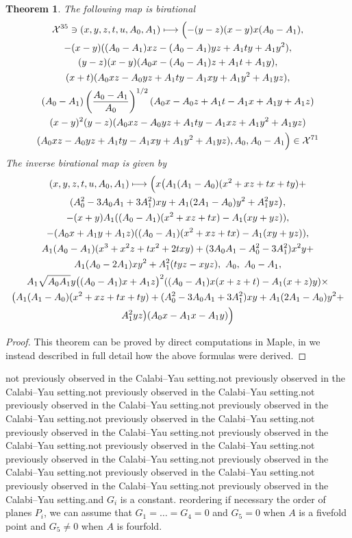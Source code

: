 \documentclass[12pt]{amsart}
\theoremstyle{plain}
\newtheorem{theorem}{Theorem}[section]
\theoremstyle{remark}
\theoremstyle{definition}
\numberwithin{table}{section}
\begin{document}
\begin{theorem}
	The following map is birational
	\begin{multline*}
		\mathcal{X}^{35}\ni(x,y,z,t,u,A_{0},A_{1}) \longmapsto
		\Bigl(
		-(y-z)(x-y)x(A_{0}-A_{1}),\\ -(x-y)((A_{0}-A_{1})xz-(A_{0}-A_{1})yz+A_{1}ty+A_{1}y^2),\\ (y-z)(x-y)(A_{0}x-(A_{0}-A_{1})z+A_{1}t+A_{1}y),\\ (x+t)(A_{0}xz-A_{0}yz+A_{1}ty-A_{1}xy+A_{1}
		y^2+A_{1}yz),\\ (A_{0}-A_{1})\left(\frac{A_{0}-A_{1}}{A_{0}}\right)^{1/2}
		(A_{0}x-A_{0}z+A_{1}t-A_{1}x+A_{1}y+A_{1}z)\\
		(x-y)^2(y-z)(A_{0}xz-A_{0}yz+A_{1}ty-A_{1}xz+A_{1}y^2+A_{1}yz)\\
		(A_{0}xz-A_{0}yz+A_{1}ty-A_{1}xy+A_{1}y^2+A_{1}yz), A_{0}, A_{0}-A_{1}
		\Bigr)\in\mathcal{X}^{71}
	\end{multline*}
	The inverse birational map is given by
	\begin{multline*}
		(x,y,z,t,u,A_{0},A_{1}) \longmapsto
		\Bigl(
		x\bigl(A_1(A_1-A_0)(x^2+xz+tx+ty)+\\(A_{0}^2-3A_0A_1+3A_1^2)xy+A_1(2A_1-A_{0})y^2+A_{1}^2yz\bigr),\\
		-(x+y)A_{1}((A_0-A_1)(x^2+xz+tx)-A_{1}(xy+yz)),\\ -(A_{0}x+A_{1}y+A_{1}z)((A_{0}-A_1)(x^2+xz+tx)-A_{1}(xy+yz)),\\
		A_1(A_0-A_1)(x^3+x^2z+tx^2+2txy)+(3A_{0}A_{1}-A_{0}^2-3A_{1}^2)x^2y+\\
		A_1(A_{0}-2A_1)xy^2+
		A_{1}^2(tyz-xyz), \ A_{0}, \ A_{0}-A_{1},\\
		A_{1}\sqrt{A_{0}A_{1}}y\bigl((A_{0}-A_{1})x+A_{1}z\bigr)^2
		((A_{0}-A_1)x(x+z+t)-A_{1}(x+z)y)\times\\
		\bigl(A_1(A_1-A_{0})(x^2+xz+tx+ty)+(A_{0}^2-3A_0A_1+3A_1^2)xy+A_1(2A_{1}-A_{0})y^2+\\A_{1}^2yz\bigr)(A_{0}x-A_{1}x-A_{1}y)
		\Bigr)
	\end{multline*}
\end{theorem}
\begin{proof}
	This theorem can be proved by direct computations in Maple, in \cite{CK-C2} we instead described in full detail how the above formulas were derived.
\end{proof}

not previously observed in the Calabi--Yau setting.not previously observed in the Calabi--Yau setting.not previously observed in the Calabi--Yau setting.not previously observed in the Calabi--Yau setting.not previously observed in the Calabi--Yau setting.not previously observed in the Calabi--Yau setting.not previously observed in the Calabi--Yau setting.not previously observed in the Calabi--Yau setting.not previously observed in the Calabi--Yau setting.not previously observed in the Calabi--Yau setting.not previously observed in the Calabi--Yau setting.not previously observed in the Calabi--Yau setting.not previously observed in the Calabi--Yau setting.not previously observed in the Calabi--Yau setting.and $G_{i}$ is a constant. reordering if necessary the order of planes $P_{i}$, we can assume that $G_{1}=\dots=G_{4}=0$ and $G_{5}=0$ when $A$ is a fivefold point and $G_{5}\not=0$ when $A$ is fourfold.
\end{document}
